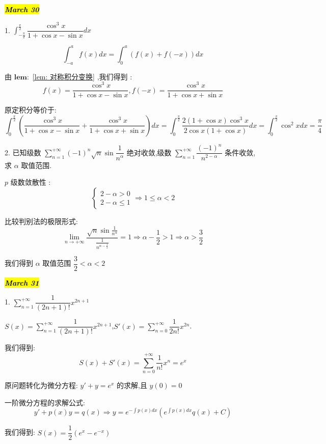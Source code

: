 \hl{\textbf{\textit{March 30}}}

1. $\int_{-\frac{\pi}{2}}^{\frac{\pi}{2}}\dfrac{\cos^3 x}{1+\cos x-\sin x}dx$

\begin{lemma}[对称积分变换]\label{lem: 对称积分变换}
	$$\int_{-a}^{a}f(x)dx=\int_{0}^{a}(f(x)+f(-x))dx$$
\end{lemma}
\begin{solution}
	
	由 $\mathbf{lem: }$ \ref{lem: 对称积分变换} ,我们得到 : 
	$$f(x)=\frac{\cos^3 x}{1+\cos x-\sin x},f(-x)=\frac{\cos^3 x}{1+\cos x+\sin x}$$
	
	原定积分等价于: 
	$$\int_{0}^{\frac{\pi}{2}}(\frac{\cos^3 x}{1+\cos x-\sin x}+\frac{\cos^3 x}{1+\cos x+\sin x})dx=\int_{0}^{\frac{\pi}{2}}\frac{2(1+\cos x)\cos^3x}{2\cos x(1+\cos x)}dx=\int_{0}^{\frac{\pi}{2}}\cos^2 xdx=\frac{\pi}{4}$$
\end{solution}

2. 已知级数 $\sum\limits_{n=1}^{+\infty}(-1)^n\sqrt{n}\sin \dfrac{1}{n^{\alpha}}$ 绝对收敛,级数 $\sum\limits_{n=1}^{+\infty}\dfrac{(-1)^n}{n^{2-\alpha}}$ 条件收敛,求 $\alpha$ 取值范围.
\begin{solution}
	
	$p$ 级数敛散性 : 
	$$\left\lbrace \begin{array}{l}
		2-\alpha>0\\2-\alpha\leq 1
	\end{array}\right. \Rightarrow 1\leq\alpha<2$$
	
	比较判别法的极限形式: 
	$$\lim\limits_{n\rightarrow+\infty}\dfrac{\sqrt{n}\sin\frac{1}{n^{\alpha}}}{\frac{1}{n^{\alpha-\frac{1}{2}}}}=1\Rightarrow \alpha-\frac{1}{2}>1\Rightarrow \alpha >\frac{3}{2}$$
	
	我们得到 $\alpha$ 取值范围 $\dfrac{3}{2}<\alpha<2$
\end{solution}

\hl{\textbf{\textit{March 31}}}

1. $\sum\limits_{n=1}^{+\infty}\dfrac{1}{(2n+1)!}x^{2n+1}$
\begin{solution}
	
	$S(x)=\sum\limits_{n=1}^{+\infty}\dfrac{1}{(2n+1)!}x^{2n+1}$,$S'(x)=\sum\limits_{n=0}^{+\infty}\dfrac{1}{2n!}x^{2n}$.
	
	我们得到: $$S(x)+S'(x)=\sum\limits_{n=0}^{+\infty}\frac{1}{n!}x^{n}=e^{x}$$
	
	原问题转化为微分方程: $y'+y=e^x$ 的求解,且 $y(0)=0$
	
	一阶微分方程的求解公式: $$y'+p(x)y=q(x)\Rightarrow y=e^{-\int p(x)dx}(e^{\int p(x)dx}q(x)+C)$$
	
	我们得到:  $S(x)=\dfrac{1}{2}(e^{x}-e^{-x})$
\end{solution}

